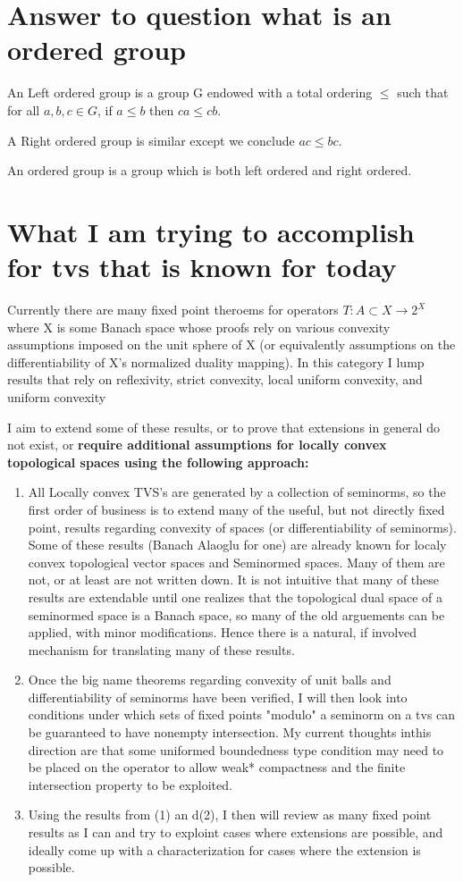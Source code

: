 \documentclass{article}
\begin{document}
    \section{Answer to question what is an ordered group}
    An Left ordered group is a group G endowed with a total ordering $\leq$ such that for all $a,b,c \in G$, if $a \leq b$ then $ca\leq cb$. 
    
    A Right ordered group is similar except we conclude $ac \leq bc$. 
    
    
    An ordered group is a group which is both left ordered and right ordered. 
    
    
    \section{What I am trying to accomplish for tvs that is known for today}
    
    
Currently there are many fixed point theroems for operators $T:A \subset X \to 2^X$ where X is some Banach space whose proofs rely on various convexity assumptions imposed on the unit sphere of X (or equivalently assumptions on the differentiability of X's normalized duality mapping). In this category I lump results that rely on reflexivity, strict convexity, local uniform convexity, and uniform convexity 

I aim to extend some of these results, or to prove that extensions in general do not exist, or \bf require \rm additional assumptions for locally convex topological spaces using the following approach:

\begin{enumerate}
    \item All Locally convex TVS's are generated by a collection of seminorms, so the first order of business is to extend many of the useful, but not directly fixed point, results regarding convexity of spaces (or differentiability of seminorms). Some of these results (Banach Alaoglu for one) are already known for localy convex topological vector spaces and Seminormed spaces. Many of them are not, or at least are not written down. It is not intuitive that many of these results are extendable until one realizes that the topological dual space of a seminormed space is a Banach space, so many of the old arguements can be applied, with minor modifications. Hence there is a natural, if involved mechanism for translating many of these results. 
    \item Once the big name theorems regarding convexity of unit balls and differentiability of seminorms have been verified, I will then look into conditions under which sets of fixed points "modulo" a seminorm on a tvs can be guaranteed to have nonempty intersection. My current thoughts inthis direction are that some uniformed boundedness type condition may need to be placed on the operator to allow weak* compactness and the finite intersection property to be exploited. 
    \item Using the results from (1) an d(2), I then will review as many fixed point results as I can and try to exploint cases where extensions are possible, and ideally come up with a characterization for cases where the extension is possible. 
\end{enumerate}
    
\end{document}
